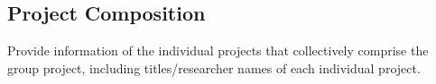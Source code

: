 \subsection{Project Composition}

Provide information of the individual projects that collectively comprise the group project, including titles/researcher names of each individual project.